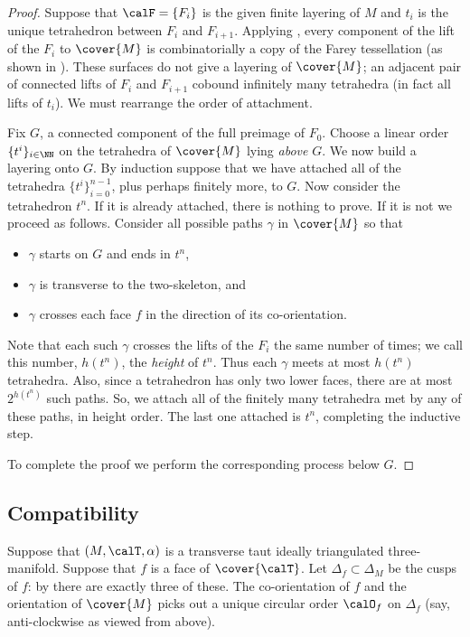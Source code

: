 \documentclass[12pt]{amsart}
\begin{document}
\begin{proof}
Suppose that $\calF = \{F_i\}$ is the given finite layering of $M$ and $t_i$ is the unique tetrahedron between $F_{i}$ and $F_{i+1}$.  Applying \cite[Corollary~1.1]{SchleimerSegerman19}, every component of the lift of the $F_i$ to $\cover{M}$ is combinatorially a copy of the Farey tessellation (as shown in ).
These surfaces do not give a layering of $\cover{M}$;  an adjacent pair of connected lifts of $F_i$ and $F_{i+1}$ cobound infinitely many tetrahedra (in fact all lifts of $t_i$).  We must rearrange the order of attachment.

Fix $G$, a connected component of the full preimage of $F_0$.  Choose a linear order $\{t^i\}_{i \in \NN}$ on the tetrahedra of $\cover{M}$ lying \emph{above} $G$.  
We now build a layering onto $G$.  By induction suppose that we have attached all of the tetrahedra $\{t^i\}_{i = 0}^{n-1}$, plus perhaps finitely more, to $G$.  Now consider the tetrahedron $t^n$.  If it is already attached, there is nothing to prove.  If it is not we proceed as follows.  Consider all possible paths $\gamma$ in $\cover{M}$ so that
\begin{itemize}
\item 
$\gamma$ starts on $G$ and ends in $t^n$,
\item 
$\gamma$ is transverse to the two-skeleton, and
\item 
$\gamma$ crosses each face $f$ in the direction of its co-orientation.
\end{itemize} 
Note that each such $\gamma$ crosses the lifts of the $F_i$ the same number of times; we call this number, $h(t^n)$, the \emph{height} of $t^n$.
Thus each $\gamma$ meets at most $h(t^n)$ tetrahedra.  Also, since a tetrahedron has only two lower faces, there are at most $2^{h(t^n)}$ such paths.  So, we attach all of the finitely many tetrahedra met by any of these paths, in height order.  The last one attached is $t^n$, completing the inductive step. 

To complete the proof we perform the corresponding process below $G$.
\end{proof}

\subsection{Compatibility}
\label{Sec:Compatibility}

Suppose that $(M, \calT, \alpha)$ is a transverse taut ideally triangulated three-manifold.  Suppose that $f$ is a face of $\cover{\calT}$.  Let $\Delta_f \subset \Delta_M$ be the cusps of $f$: by  there are exactly three of these.  The co-orientation of $f$ and the orientation of $\cover{M}$ picks out a unique circular order $\calO_f$ on $\Delta_f$ (say, anti-clockwise as viewed from above).  
\end{document}
